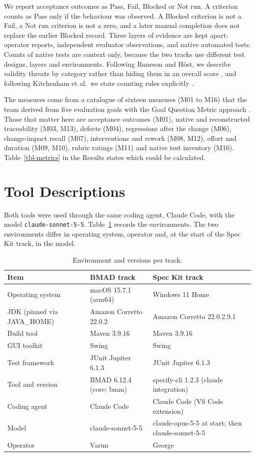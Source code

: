 \documentclass[conference]{IEEEtran}
\begin{document}
We report acceptance outcomes as Pass, Fail, Blocked or Not run. A
criterion counts as Pass only if the behaviour was observed. A Blocked
criterion is not a Fail, a Not run criterion is not a zero, and a later
manual completion does not replace the earlier Blocked record. Three
layers of evidence are kept apart: operator reports, independent
evaluator observations, and native automated tests. Counts of native
tests are context only, because the two tracks use different test
designs, layers and environments. Following Runeson and Höst, we
describe validity threats by category rather than hiding them in an
overall score \cite{runeson2009}, and following Kitchenham et al.~we
state counting rules explicitly \cite{kitchenham2002}.

The measures come from a catalogue of sixteen measures (M01 to M16) that
the team derived from five evaluation goals with the Goal Question
Metric approach \cite{basili1994}. Those that matter here are
acceptance outcomes (M01), native and reconstructed traceability (M03,
M13), defects (M04), regressions after the change (M06), change-impact
recall (M07), interventions and rework (M08, M12), effort and duration
(M09, M10), rubric ratings (M11) and native test inventory (M16).
Table~\ref{tbl-metrics} in the Results states which could be
calculated.

\section{Tool Descriptions}\label{tool-descriptions}

Both tools were used through the same coding agent, Claude Code, with
the model \texttt{claude-sonnet-5-5}. Table~\ref{tbl-env} records
the environments. The two environments differ in operating system,
operator and, at the start of the Spec Kit track, in the model.

\begin{table}[htbp]
\caption{Environment and versions per track.}\label{tbl-env}
\centering\footnotesize
\begin{tabular}{p{} p{} p{}}
\hline
\textbf{Item} & \textbf{BMAD track} & \textbf{Spec Kit track} \\
\hline
Operating system & macOS 15.7.1 (arm64) & Windows 11 Home \\
JDK (pinned via JAVA\_HOME) & Amazon Corretto 22.0.2 & Amazon Corretto 22.0.2.9.1 \\
Build tool & Maven 3.9.16 & Maven 3.9.16 \\
GUI toolkit & Swing & Swing \\
Test framework & JUnit Jupiter 6.1.3 & JUnit Jupiter 6.1.3 \\
Tool and version & BMAD 6.12.4 (core; bmm) & specify-cli 1.2.3 (claude integration) \\
Coding agent & Claude Code & Claude Code (VS Code extension) \\
Model & claude-sonnet-5-5 & claude-opus-5-5 at start; then claude-sonnet-5-5 \\
Operator & Varun & George \\
\hline
\end{tabular}
\end{table}
\end{document}
